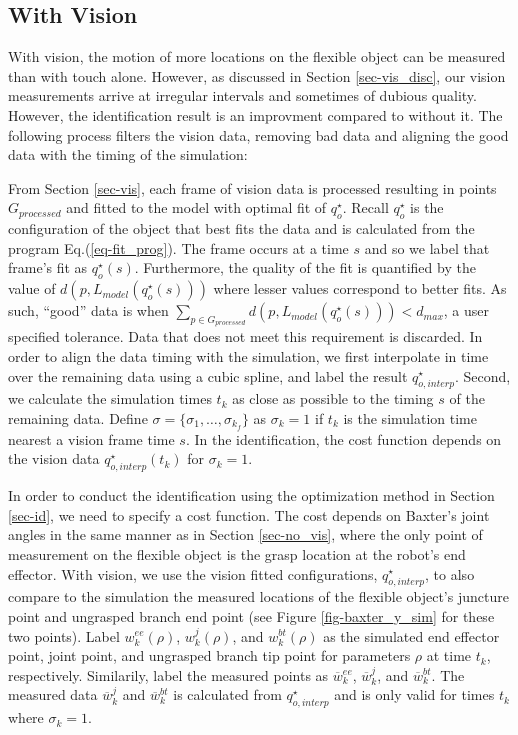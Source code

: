 \documentclass[runningheads,a4paper]{llncs}
\begin{document}
\subsection{With Vision \label{sec-w_vis}}
With vision, the motion of more locations on the flexible object can be measured than with touch alone. However, as discussed in Section \ref{sec-vis_disc}, our vision measurements arrive at irregular intervals and sometimes of dubious quality. However, the identification result is an improvment compared to without it. The following process filters the vision data, removing bad data and aligning the good data with the timing of the simulation:

From Section \ref{sec-vis}, each frame of vision data is processed resulting in points $G_{processed}$ and fitted to the model with optimal fit of $q_o^\star$. Recall $q_o^\star$ is the configuration of the object that best fits the data and is calculated from the program Eq.(\ref{eq-fit_prog}). The frame occurs at a time $s$ and so we label that frame's fit as $q_o^\star(s)$.  Furthermore, the quality of the fit is quantified by the value of $d(p,L_{model}(q_o^\star(s)))$ where lesser values correspond to better fits.  As such, ``good'' data is when $\sum_{p\in G_{processed}}d(p,L_{model}(q_o^\star(s)))<d_{max}$, a user specified tolerance. Data that does not meet this requirement is discarded.  In order to align the data timing with the simulation, we first interpolate in time over the remaining data using a cubic spline, and label the result $q_{o,interp}^\star$.  Second, we calculate the simulation times $t_k$ as close as possible to the timing $s$ of the remaining data. Define $\sigma = \{\sigma_1,\ldots,\sigma_{k_f}\}$ as $\sigma_k = 1$ if $t_k$ is the simulation time nearest a vision frame time $s$.  In the identification, the cost function depends on the vision data $q_{o,interp}^\star(t_k)$ for $\sigma_k = 1$.

In order to conduct the identification using the optimization method in Section \ref{sec-id}, we need to specify a cost function.  The cost depends on Baxter's joint angles in the same manner as in Section \ref{sec-no_vis}, where the only point of measurement on the flexible object is the grasp location at the robot's end effector. With vision, we use the vision fitted configurations, $q_{o,interp}^\star$, to also compare to the simulation the measured locations of the flexible object's juncture point and ungrasped branch end point (see Figure \ref{fig-baxter_y_sim} for these two points). Label $w_k^{ee}(\rho)$, $w_k^j (\rho)$, and $w_k^{bt}(\rho)$ as the simulated end effector point, joint point, and ungrasped branch tip point for parameters $\rho$ at time $t_k$, respectively. Similarily, label the measured points as $\overline{w}_k^{ee}$, $\overline{w}_k^j$, and $\overline{w}_k^{bt}$. The measured data $\overline{w}_k^{j}$ and $\overline{w}_k^{bt}$ is calculated from $q_{o,interp}^\star$ and is only valid for times $t_k$ where $\sigma_k = 1$.  
\end{document}
